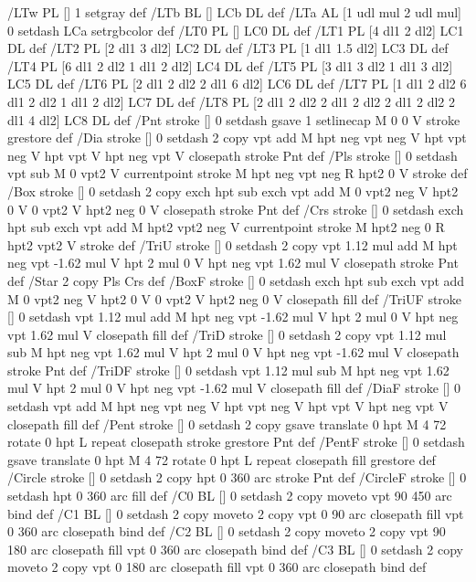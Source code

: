 /LTw {PL [] 1 setgray} def
/LTb {BL [] LCb DL} def
/LTa {AL [1 udl mul 2 udl mul] 0 setdash LCa setrgbcolor} def
/LT0 {PL [] LC0 DL} def
/LT1 {PL [4 dl1 2 dl2] LC1 DL} def
/LT2 {PL [2 dl1 3 dl2] LC2 DL} def
/LT3 {PL [1 dl1 1.5 dl2] LC3 DL} def
/LT4 {PL [6 dl1 2 dl2 1 dl1 2 dl2] LC4 DL} def
/LT5 {PL [3 dl1 3 dl2 1 dl1 3 dl2] LC5 DL} def
/LT6 {PL [2 dl1 2 dl2 2 dl1 6 dl2] LC6 DL} def
/LT7 {PL [1 dl1 2 dl2 6 dl1 2 dl2 1 dl1 2 dl2] LC7 DL} def
/LT8 {PL [2 dl1 2 dl2 2 dl1 2 dl2 2 dl1 2 dl2 2 dl1 4 dl2] LC8 DL} def
/Pnt {stroke [] 0 setdash gsave 1 setlinecap M 0 0 V stroke grestore} def
/Dia {stroke [] 0 setdash 2 copy vpt add M
  hpt neg vpt neg V hpt vpt neg V
  hpt vpt V hpt neg vpt V closepath stroke
  Pnt} def
/Pls {stroke [] 0 setdash vpt sub M 0 vpt2 V
  currentpoint stroke M
  hpt neg vpt neg R hpt2 0 V stroke
 } def
/Box {stroke [] 0 setdash 2 copy exch hpt sub exch vpt add M
  0 vpt2 neg V hpt2 0 V 0 vpt2 V
  hpt2 neg 0 V closepath stroke
  Pnt} def
/Crs {stroke [] 0 setdash exch hpt sub exch vpt add M
  hpt2 vpt2 neg V currentpoint stroke M
  hpt2 neg 0 R hpt2 vpt2 V stroke} def
/TriU {stroke [] 0 setdash 2 copy vpt 1.12 mul add M
  hpt neg vpt -1.62 mul V
  hpt 2 mul 0 V
  hpt neg vpt 1.62 mul V closepath stroke
  Pnt} def
/Star {2 copy Pls Crs} def
/BoxF {stroke [] 0 setdash exch hpt sub exch vpt add M
  0 vpt2 neg V hpt2 0 V 0 vpt2 V
  hpt2 neg 0 V closepath fill} def
/TriUF {stroke [] 0 setdash vpt 1.12 mul add M
  hpt neg vpt -1.62 mul V
  hpt 2 mul 0 V
  hpt neg vpt 1.62 mul V closepath fill} def
/TriD {stroke [] 0 setdash 2 copy vpt 1.12 mul sub M
  hpt neg vpt 1.62 mul V
  hpt 2 mul 0 V
  hpt neg vpt -1.62 mul V closepath stroke
  Pnt} def
/TriDF {stroke [] 0 setdash vpt 1.12 mul sub M
  hpt neg vpt 1.62 mul V
  hpt 2 mul 0 V
  hpt neg vpt -1.62 mul V closepath fill} def
/DiaF {stroke [] 0 setdash vpt add M
  hpt neg vpt neg V hpt vpt neg V
  hpt vpt V hpt neg vpt V closepath fill} def
/Pent {stroke [] 0 setdash 2 copy gsave
  translate 0 hpt M 4 {72 rotate 0 hpt L} repeat
  closepath stroke grestore Pnt} def
/PentF {stroke [] 0 setdash gsave
  translate 0 hpt M 4 {72 rotate 0 hpt L} repeat
  closepath fill grestore} def
/Circle {stroke [] 0 setdash 2 copy
  hpt 0 360 arc stroke Pnt} def
/CircleF {stroke [] 0 setdash hpt 0 360 arc fill} def
/C0 {BL [] 0 setdash 2 copy moveto vpt 90 450 arc} bind def
/C1 {BL [] 0 setdash 2 copy moveto
	2 copy vpt 0 90 arc closepath fill
	vpt 0 360 arc closepath} bind def
/C2 {BL [] 0 setdash 2 copy moveto
	2 copy vpt 90 180 arc closepath fill
	vpt 0 360 arc closepath} bind def
/C3 {BL [] 0 setdash 2 copy moveto
	2 copy vpt 0 180 arc closepath fill
	vpt 0 360 arc closepath} bind def
